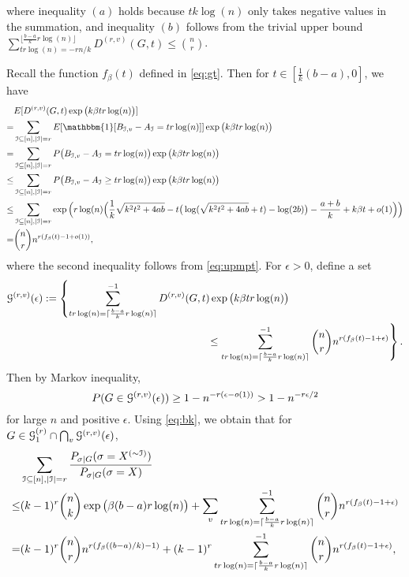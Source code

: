 \documentclass{article}
\begin{document}
where inequality $(a)$ holds because $tk\log(n)$ only takes negative values in the summation, and inequality $(b)$ follows from the trivial upper bound
$\sum_{tr\log(n)=-rn/k}^{\lfloor\frac{b-a}{k}r\log(n) \rfloor} D^{(r,v)}(G,t)\le \binom{n}{r}$.




Recall the function $f_{\beta}(t)$ defined in \eqref{eq:gt}.
Then for $t\in [\frac{1}{k}(b-a), 0]$, we have 
\begin{align*}
& E[D^{(r,v)}(G,t) \exp\big(k\beta t r \log(n) \big)] \\
= & \sum_{\cI\subseteq[n],|\cI|=r} E[\mathbbm{1}[B_{\cI,v}-A_{\cI}=t r \log(n)]] \exp\big(k\beta t r \log(n) \big) \\
= & \sum_{\cI\subseteq[n],|\cI|=r} P\big(B_{\cI,v}-A_{\cI}=t r \log(n) \big) \exp\big(k\beta t r \log(n) \big) \\
\le & \sum_{\cI\subseteq[n],|\cI|=r} P\big(B_{\cI,v}-A_{\cI} \ge t r \log(n) \big) \exp\big(k\beta t r \log(n) \big) \\
\le &  \sum_{\cI\subseteq[n],|\cI|=r} \exp\Big( r \log(n)
\Big(\frac{1}{k}\sqrt{k^2t^2+4ab} -t\big(\log(\sqrt{k^2t^2+4ab}+t)-\log(2b) \big) -\frac{a+b}{k} +k\beta t +o(1) \Big)\Big) \\
= & \binom{n}{r} n^{r(f_{\beta}(t)-1+o(1))} ,
\end{align*}
where the second inequality follows from \eqref{eq:upmpt}.
For $\epsilon>0$, define a set
\begin{equation} \label{eq:gep}
\begin{aligned}
\mathcal{G}^{(r,v)}(\epsilon):=\left\{
\sum_{tr\log(n)=\lceil\frac{b-a}{k}r\log(n) \rceil}^{-1} D^{(r,v)}(G,t) \exp  \big(k\beta t r \log(n) \big) \hspace*{1.5in} \right. \\
\left.
 \le  \sum_{tr\log(n)=\lceil\frac{b-a}{k}r\log(n) \rceil}^{-1}
\binom{n}{r} n^{r(f_{\beta}(t)-1+\epsilon)}
\right\} .
\end{aligned}
\end{equation}
Then by Markov inequality,
\begin{equation} \label{eq:Gk}
P(G\in \mathcal{G}^{(r,v)}(\epsilon))\ge 1-n^{-r(\epsilon-o(1))} >1-n^{-r\epsilon/2}
\end{equation}
for large $n$ and positive $\epsilon$.
Using \eqref{eq:bk}, we obtain that for $G\in\mathcal{G}_1^{(r)}\cap \bigcap_{v} \mathcal{G}^{(r,v)}(\epsilon)$,
\begin{equation}  \label{eq:3l}
\begin{aligned}
& \sum_{\mathcal{I}\subseteq[n],|\mathcal{I}|=r}
\frac{P_{\sigma|G}(\sigma=X^{(\sim \mathcal{I})} )}
{P_{\sigma|G}(\sigma=X)}  \\
\le & (k-1)^r\binom{n}{k}
\exp\big(\beta(b-a) r \log(n) \big)  + \sum_v\sum_{tr\log(n)=\lceil\frac{b-a}{k}r\log(n) \rceil}^{-1}
\binom{n}{r} n^{r(f_{\beta}(t)-1+\epsilon)} \\
= & (k-1)^r\binom{n}{r} n^{r(f_{\beta}((b-a)/k)-1)} + (k-1)^r\sum_{tr\log(n)=\lceil\frac{b-a}{k}r\log(n) \rceil}^{-1}
\binom{n}{r} n^{r(f_{\beta}(t)-1+\epsilon)} ,
\end{aligned}
\end{equation}
\end{document}
